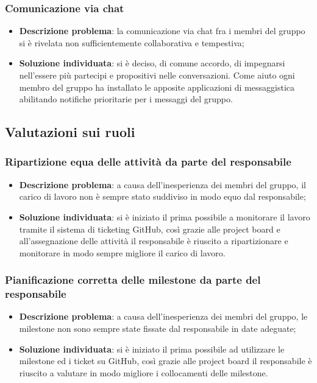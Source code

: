 		\subsubsection{Comunicazione via chat}
			\begin{itemize}
			\item \textbf{Descrizione problema}: la comunicazione via chat fra i membri del gruppo si è rivelata non sufficientemente collaborativa e tempestiva;
			\item \textbf{Soluzione individuata}: si è deciso, di comune accordo, di impegnarsi nell'essere più partecipi e propositivi nelle conversazioni. Come aiuto ogni membro del gruppo ha installato le apposite applicazioni di messaggistica abilitando notifiche prioritarie per i messaggi del gruppo.
			\end{itemize}
\subsection{Valutazioni sui ruoli}
	\subsubsection{Ripartizione equa delle attività da parte del responsabile}
	\begin{itemize}
		\item \textbf{Descrizione problema}: a causa dell'inesperienza dei membri del gruppo, il carico di lavoro non è sempre stato suddiviso in modo equo dal responsabile;
		\item \textbf{Soluzione individuata}: si è iniziato il prima possibile a monitorare il lavoro tramite il sistema di ticketing GitHub, così grazie alle project board e all'assegnazione delle attività il responsabile è riuscito a ripartizionare e monitorare in modo sempre migliore il carico di lavoro.
	\end{itemize}
	\subsubsection{Pianificazione corretta delle milestone da parte del responsabile}
	\begin{itemize}
	\item \textbf{Descrizione problema}: a causa dell'inesperienza dei membri del gruppo, le milestone non sono sempre state fissate dal responsabile in date adeguate;
	\item \textbf{Soluzione individuata}: si è iniziato il prima possibile ad utilizzare le milestone ed i ticket su GitHub, così grazie alle project board il responsabile è riuscito a valutare in modo migliore i collocamenti delle milestone.
	\end{itemize}
